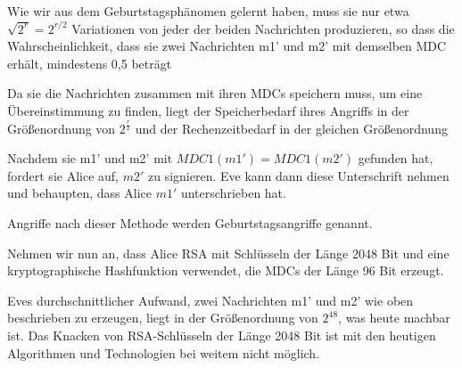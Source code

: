 \documentclass[a4paper]{article}
\begin{document}
\begin{multicols}{3}
\begin{itemize*}
\begin{itemize*}
            \end{itemize*}
            \item Wie wir aus dem Geburtstagsphänomen gelernt haben, muss sie nur etwa $\sqrt{2^r}=2^{r/2}$ Variationen von jeder der beiden Nachrichten produzieren, so dass die Wahrscheinlichkeit, dass sie zwei Nachrichten m1' und m2' mit demselben MDC erhält, mindestens 0,5 beträgt
            \item Da sie die Nachrichten zusammen mit ihren MDCs speichern muss, um eine Übereinstimmung zu finden, liegt der Speicherbedarf ihres Angriffs in der Größenordnung von $2^{\frac{r}{2}}$ und der Rechenzeitbedarf in der gleichen Größenordnung
            \item Nachdem sie m1' und m2' mit $MDC1(m1')=MDC1(m2')$ gefunden hat, fordert sie Alice auf, $m2'$ zu signieren. Eve kann dann diese Unterschrift nehmen und behaupten, dass Alice $m1'$ unterschrieben hat.
            \item Angriffe nach dieser Methode werden Geburtstagsangriffe genannt.
            \item Nehmen wir nun an, dass Alice RSA mit Schlüsseln der Länge 2048 Bit und eine kryptographische Hashfunktion verwendet, die MDCs der Länge 96 Bit erzeugt.
            \item Eves durchschnittlicher Aufwand, zwei Nachrichten m1' und m2' wie oben beschrieben zu erzeugen, liegt in der Größenordnung von $2^{48}$, was heute machbar ist. Das Knacken von RSA-Schlüsseln der Länge 2048 Bit ist mit den heutigen Algorithmen und Technologien bei weitem nicht möglich.
      \end{itemize*}


\end{multicols}
\end{document}
